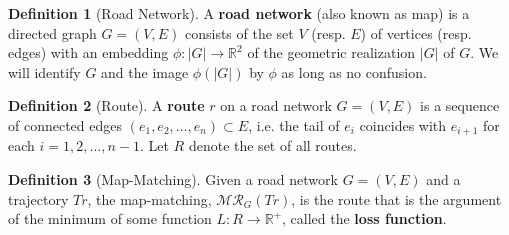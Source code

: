 \documentclass{article}
\numberwithin{equation}{section}
\theoremstyle{definition}
\newtheorem{definition}{Definition}[section]
\begin{document}



\begin{definition}[Road Network] \label{RN}
A  \textbf{road network} (also known as map) is a directed graph $G=(V,E)$ consists of the set $V$ (resp. $E$) of vertices (resp. edges) with an embedding $\phi:|G|\rightarrow\mathbb{R}^{2}$ of the geometric realization $|G|$ of $G$.
We will identify $G$ and the image $\phi(|G|)$ by $\phi$ as long as no confusion.
\end{definition}



\begin{definition}[Route]
A \textbf{route} $r$ on a road network $G=(V,E)$ is a sequence of connected edges $(e_1,e_2,\dots,e_n)\subset E$, i.e. 
the tail of $e_i$ coincides with $e_{i+1}$ for each $i = 1, 2, \dots, n-1$.
Let $R$ denote the set of all routes.
\end{definition}


\begin{definition}[Map-Matching]
Given a road network $G=(V, E)$ and a trajectory
$Tr$, the map-matching, $\mathcal{MR}_G(Tr)$, is the route that is the argument of the minimum of some function $L:R\rightarrow \mathbb{R}^+$, called the \textbf{loss function}. 
\end{definition}

\end{document}
